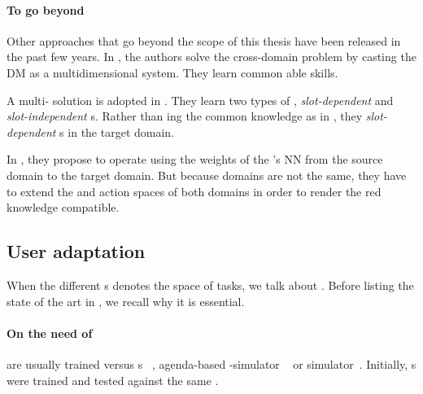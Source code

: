 \paragraph{To go beyond}

Other approaches that go beyond the scope of this thesis have been released in the past few years. In \textcite{Keizer2016-tl-dialogue,Keizer2018-tl-dialogue}, the authors solve the cross-domain problem by casting the \gls{DM} as a multidimensional system. They learn common able skills.

A multi- solution is adopted in \textcite{Chen2018-tl-dialogue}. They learn two types of , \textit{slot-dependent} and \textit{slot-independent} s. Rather than ing the common knowledge as in \textcite{Keizer2018-tl-dialogue}, they  \textit{slot-dependent} s in the target domain.

In \textcite{Ilievski2018-tl-dialogue}, they propose to operate  using the weights of the 's \gls{NN} from the source domain to the target domain. But because domains are not the same, they have to extend the  and action spaces of both domains in order to render the red knowledge compatible.

\subsection{User adaptation}




When the different s denotes the space of tasks, we talk about . Before listing the state of the art in , we recall why it is essential.

\paragraph{On the need of }

 are usually trained versus s~\parencite{eckert1998bigram,first-mdp-sds,levin2000stochastic,these-pietquin,asri2016rnn} , agenda-based -simulator ~\parencite{schatzmann2008statistical, keizer2010parameter} or  simulator~\parencite{laroche2017ndg,khouzaimi2017-sim-dialogue}. Initially, s were trained and tested against the same .

